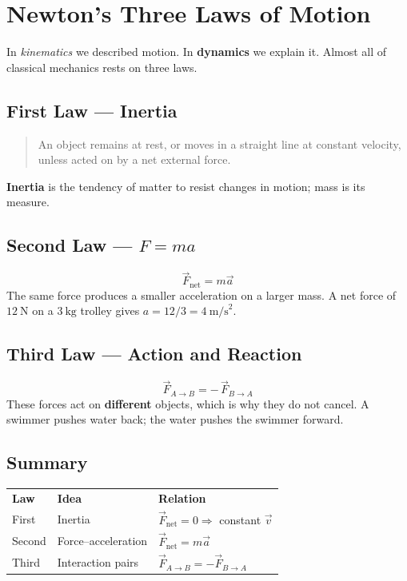 
\section*{Newton's Three Laws of Motion}

In \emph{kinematics} we described motion. In \textbf{dynamics} we explain
it. Almost all of classical mechanics rests on three laws.

\subsection*{First Law --- Inertia}
\begin{quote}
An object remains at rest, or moves in a straight line at constant
velocity, unless acted on by a net external force.
\end{quote}
\textbf{Inertia} is the tendency of matter to resist changes in motion;
mass is its measure.

\subsection*{Second Law --- $F = ma$}
\begin{equation}
  \vec{F}_{\text{net}} = m\vec{a}
\end{equation}
The same force produces a smaller acceleration on a larger mass.
A net force of $12\ \text{N}$ on a $3\ \text{kg}$ trolley gives
$a = 12/3 = 4\ \text{m/s}^{2}$.

\subsection*{Third Law --- Action and Reaction}
\begin{equation}
  \vec{F}_{A \to B} = -\,\vec{F}_{B \to A}
\end{equation}
These forces act on \textbf{different} objects, which is why they do not
cancel. A swimmer pushes water back; the water pushes the swimmer forward.

\subsection*{Summary}
\begin{center}
\begin{tabular}{lll}
\textbf{Law} & \textbf{Idea} & \textbf{Relation} \\
First  & Inertia            & $\vec{F}_{\text{net}}=0 \Rightarrow$ constant $\vec{v}$ \\
Second & Force--acceleration & $\vec{F}_{\text{net}} = m\vec{a}$ \\
Third  & Interaction pairs  & $\vec{F}_{A\to B} = -\vec{F}_{B\to A}$ \\
\end{tabular}
\end{center}
